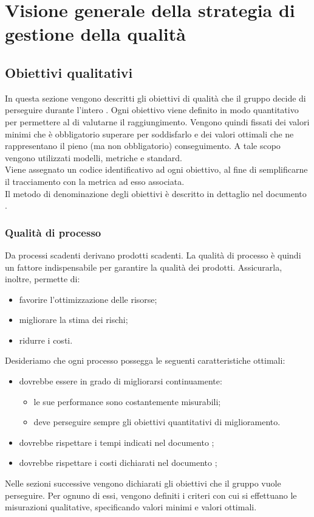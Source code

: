 \documentclass[PianoDiQualifica.tex]{subfiles}
\begin{document}
\section{Visione generale della strategia di gestione della qualità}
	\subsection{Obiettivi qualitativi}
		In questa sezione vengono descritti gli obiettivi di qualità che il gruppo \GRUPPO{} decide di perseguire durante l'intero .
		Ogni obiettivo viene definito in modo quantitativo per permettere al  di valutarne il raggiungimento.
		Vengono quindi fissati dei valori minimi che è obbligatorio superare per soddisfarlo e dei valori ottimali che ne rappresentano il pieno (ma non obbligatorio) conseguimento.
		A tale scopo vengono utilizzati modelli, metriche e standard. \\
		Viene assegnato un codice identificativo ad ogni obiettivo, al fine di semplificarne il tracciamento con la metrica ad esso associata. \\
		Il metodo di denominazione degli obiettivi è descritto in dettaglio nel documento \NPdocRR{}.

		\subsubsection{Qualità di processo}
		Da processi scadenti derivano prodotti scadenti. La qualità di processo è quindi un fattore indispensabile per garantire la qualità dei prodotti. Assicurarla, inoltre, permette di:
		\begin{itemize}
			\item favorire l'ottimizzazione delle risorse;
			\item migliorare la stima dei rischi;
			\item ridurre i costi.
		\end{itemize}
		Desideriamo che ogni processo possegga le seguenti caratteristiche ottimali:
		\begin{itemize}
			\item dovrebbe essere in grado di migliorarsi continuamente:
			\begin{itemize}
					\item le sue performance sono costantemente misurabili;
					\item deve perseguire sempre gli obiettivi quantitativi di miglioramento.
			\end{itemize}
			\item dovrebbe rispettare i tempi indicati nel documento \PPdocRR;
			\item dovrebbe rispettare i costi dichiarati nel documento \PPdocRR;
		\end{itemize}
		Nelle sezioni successive vengono dichiarati gli obiettivi che il gruppo vuole perseguire. Per ognuno di essi, vengono definiti i criteri con cui si effettuano le misurazioni qualitative,
		specificando valori minimi e valori ottimali.
\end{document}
